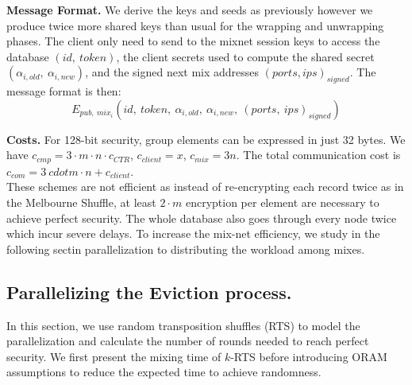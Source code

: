 \documentclass{llncs}
\begin{document}
\noindent\textbf{Message Format.}
We derive the keys and seeds as previously however we produce twice more shared keys than usual for the wrapping and unwrapping phases. \iffalse\\
Let $\kappa$ be the security parameter. We call $\mathcal{G}$ a prime order cyclic group satisfying the Decisional Diffie-Hellman Assumption. $\mathcal{G}^*$ is the set of non-identity elements of $\mathcal{G}$. The element $g$ is a generator of the group, and $q$ is the prime order of $\mathcal{G}$ with $q \approx 2^{2\kappa}$.\\
We suppose each mix owns a pair of keys ($\ priv_i \in \mathbb{Z}_{q}^*$, $pub_i=g^{priv_i}\in \mathcal{G}^*$). We assume the existence of a PKI that publishes a list of all ($mix_i$,\ $pub_i$) pair.
The client randomly chooses $x\in_\mathcal{R} \mathbb{Z}_q^*$ and sends to the mix $mix_i$ the element $\alpha_i=g^{x\cdot b_i}$ with $b_i$ a binding factors, the shared secret is then $s_i=pub_i^{x\cdot b_i}$.
\fi
The client only need to send to the mixnet session keys to access the database $(id,\ token)$, the client secrets used to compute the shared secret $( \alpha_{i,old},\ \alpha_{i,new} )$, and the signed next mix addresses $(ports,ips)_{signed}$.
The message format is then: $$E_{pub,\ mix_i}\left(id,\ token,\ \alpha_{i,old},\ \alpha_{i,new},\ (ports,\ ips)_{signed} \right)$$ 


\noindent\textbf{Costs.} For 128-bit security, group elements can be expressed in just 32 bytes. We have $c_{cmp} = 3 \cdot m \cdot n \cdot c_{CTR} $, $c_{client}=  x$, $c_{mix}=3n$. The total communication cost is $c_{com}=3 \ cdot m \cdot n + c_{client}$.\\


These schemes are not efficient as instead of re-encrypting each record twice as in the Melbourne Shuffle, at least $2\cdot m$ encryption per element are necessary to achieve perfect security. The whole database also goes through every node twice which incur severe delays. To increase the mix-net efficiency, we study in the following sectin parallelization to distributing the workload among mixes.
%
\subsection{Parallelizing the Eviction process.}\label{Parallel}
In this section, we use random transposition shuffles (RTS) to model the parallelization  and calculate the number of rounds needed to reach perfect security.
We first present the mixing time of $k$-RTS before introducing ORAM assumptions to reduce the expected time to achieve randomness.
%
\end{document}
